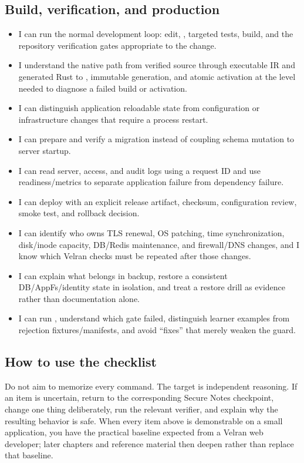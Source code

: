 \subsection*{Build, verification, and production}
\begin{itemize}[label={\texttt{[ ]}},leftmargin=2em]
  \item I can run the normal development loop: edit, , targeted tests, build, and the repository verification gates appropriate to the change.
  \item I understand the native path from verified source through executable IR and generated Rust to , immutable generation, and atomic activation at the level needed to diagnose a failed build or activation.
  \item I can distinguish application reloadable state from configuration or infrastructure changes that require a process restart.
  \item I can prepare and verify a migration instead of coupling schema mutation to server startup.
  \item I can read server, access, and audit logs using a request ID and use readiness/metrics to separate application failure from dependency failure.
  \item I can deploy with an explicit release artifact, checksum, configuration review, smoke test, and rollback decision.
  \item I can identify who owns TLS renewal, OS patching, time synchronization, disk/inode capacity, DB/Redis maintenance, and firewall/DNS changes, and I know which Velran checks must be repeated after those changes.
  \item I can explain what belongs in backup, restore a consistent DB/AppFs/identity state in isolation, and treat a restore drill as evidence rather than documentation alone.
  \item I can run , understand which gate failed, distinguish learner examples from rejection fixtures/manifests, and avoid ``fixes'' that merely weaken the guard.
\end{itemize}

\subsection*{How to use the checklist}
Do not aim to memorize every command. The target is independent reasoning. If an item is uncertain, return to the corresponding Secure Notes checkpoint, change one thing deliberately, run the relevant verifier, and explain why the resulting behavior is safe. When every item above is demonstrable on a small application, you have the practical baseline expected from a Velran web developer; later chapters and reference material then deepen rather than replace that baseline.

